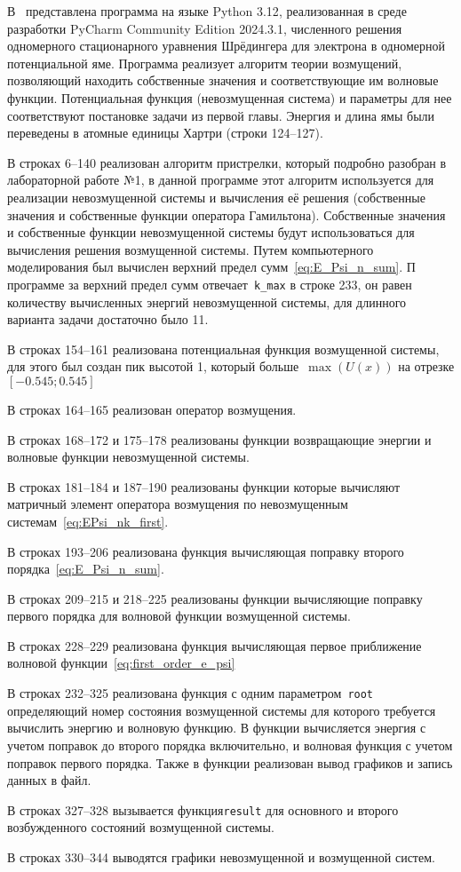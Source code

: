 В~ представлена программа на языке Python 3.12\cite{python},
реализованная в среде разработки PyCharm Community Edition 2024.3.1,
численного решения одномерного стационарного уравнения Шрёдингера для электрона в одномерной потенциальной яме.
Программа реализует алгоритм теории возмущений,
позволяющий находить собственные значения и соответствующие им волновые функции.
Потенциальная функция (невозмущенная система) и параметры для нее соответствуют постановке задачи из первой главы.
Энергия и длина ямы были переведены в атомные единицы Хартри (строки 124--127).


В строках 6--140 реализован алгоритм пристрелки, который подробно разобран в лабораторной работе №1,
в данной программе этот алгоритм используется для реализации невозмущенной системы и вычисления её решения
(собственные значения и собственные функции оператора Гамильтона).
Собственные значения и собственные функции невозмущенной системы будут использоваться для вычисления решения возмущенной системы.
Путем компьютерного моделирования был вычислен верхний предел сумм~\eqref{eq:E_Psi_n_sum}.
П программе за верхний предел сумм отвечает~\lstinline{k_max} в строке 233,
он равен количеству вычисленных энергий невозмущенной системы, для длинного варианта задачи достаточно было 11.


В строках 154--161 реализована потенциальная функция возмущенной системы, для этого был создан пик высотой 1, который больше~$\max(U(x))$ на отрезке $\left[ -0.545; 0.545 \right]$


В строках 164--165 реализован оператор возмущения.


В строках 168--172 и 175--178 реализованы функции возвращающие энергии и волновые функции невозмущенной системы.


В строках 181--184 и 187--190 реализованы функции которые вычисляют матричный элемент оператора возмущения по невозмущенным системам~\eqref{eq:EPsi_nk_first}.


В строках 193--206 реализована функция вычисляющая поправку второго порядка~\eqref{eq:E_Psi_n_sum}.


В строках 209--215 и 218--225 реализованы функции вычисляющие поправку первого порядка для волновой функции возмущенной системы.


В строках 228--229 реализована функция вычисляющая первое приближение волновой функции~\eqref{eq:first_order_e_psi}


В строках 232--325 реализована функция с одним параметром~\lstinline{root} определяющий номер состояния возмущенной системы для которого требуется вычислить энергию и волновую функцию.
В функции вычисляется энергия с учетом поправок до второго порядка включительно, и волновая функция с учетом поправок первого порядка.
Также в функции реализован вывод графиков и запись данных в файл.


В строках 327--328 вызывается функция\lstinline{result} для основного и второго возбужденного состояний возмущенной системы.


В строках 330--344 выводятся графики невозмущенной и возмущенной систем.